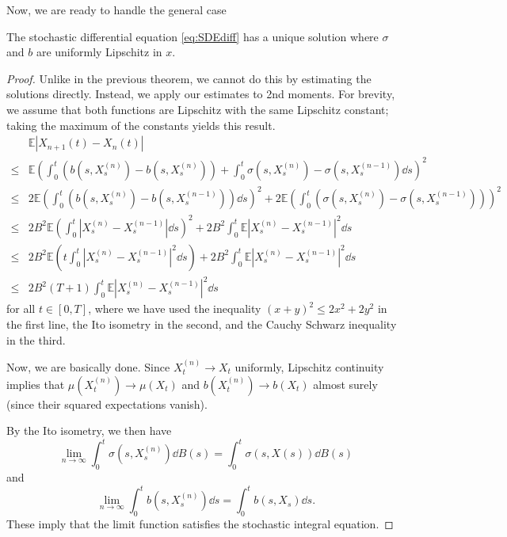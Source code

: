 \documentclass[prb,12pt]{revtex4-2}
\theoremstyle{definition}
\theoremstyle{definition}
\theoremstyle{definition}
\begin{document}
Now, we are ready to handle the general case
\begin{Theorem}
	The stochastic differential equation \eqref{eq:SDEdiff} has a unique solution where $\sigma$ and $b$ are uniformly Lipschitz in $x$.
\end{Theorem}
\begin{proof}
	Unlike in the previous theorem, we cannot do this by estimating the solutions directly. Instead, we apply our estimates to 2nd moments. For brevity, we assume that both functions are Lipschitz with the same Lipschitz constant; taking the maximum of the constants yields this result. 
	\begin{align*}
		&\mathbb{E}|X_{n+1}(t) - X_n(t)|\\
	\le &\mathbb{E}\left( \int_0^t (b(s, X^{(n)}_s) - b(s, X^{(n)}_s)) + \int_0^t \sigma(s, X^{(n)}_s) - \sigma(s, X^{(n-1)}_s)\dd{s}\right)^2\\
		\le & 2\mathbb{E}\left( \int_0^t (b(s, X^{(n)}_s) - b(s, X^{(n-1)}_s))\dd{s} \right)^2 + 2\mathbb{E}\left( \int_0^t (\sigma(s, X^{(n)}_s) - \sigma(s, X^{(n-1)}_s)) \right)^2\\
		\le& 2B^2 \mathbb{E}\left( \int_0^t |X^{(n)}_s - X^{(n-1)}_s|\dd{s} \right)^2 + 2B^2 \int_0^t \mathbb{E}|X^{(n)}_s - X^{(n-1)}_s|^2 \dd{s}\\
		\le& 2B^2 \mathbb{E}\left( t\int_0^t |X^{(n)}_s - X^{(n-1)}_s|^2\dd{s} \right)+2B^2 \int_0^t \mathbb{E}|X^{(n)}_s - X^{(n-1)}_s|^2\dd{s}\\
		\le& 2B^2(T+1)\int_0^t \mathbb{E}|X^{(n)}_s - X^{(n-1)}_s|^2\dd{s}
	\end{align*}
	for all $t\in [0,T]$, where we have used the inequality $(x+y)^2 \le 2x^2+2y^2$ in the first line, the Ito isometry in the second, and the Cauchy Schwarz inequality in the third.

	Now, we are basically done. Since $X^{(n)}_t \to X_t$ uniformly, Lipschitz continuity implies that $\mu(X^{(n)}_t) \to \mu(X_t)$ and $b(X^{(n)}_t)\to b(X_t)$ almost surely (since their squared expectations vanish). 

	By the Ito isometry, we then have
	\[
	\lim_{n \to \infty} \int_0^t \sigma(s, X^{(n)}_s)\dd{B(s)} = \int_0^t \sigma(s, X(s))\dd{B(s)}
	\]
	and
	\[
	\lim_{n \to \infty} \int_0^t b(s, X^{(n)}_s)\dd{s} = \int_0^t b(s, X_s)\dd{s}
	.\] 
	These imply that the limit function satisfies the stochastic integral equation.
\end{proof}
\end{document}
